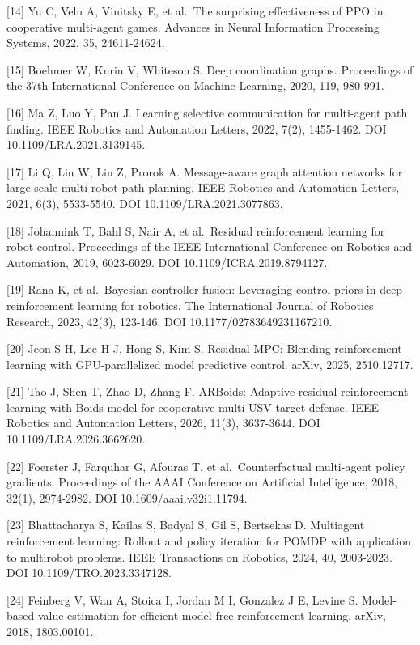 \documentclass[UTF8,a4paper,zihao=5,fontset=none]{ctexart}
\begin{document}
{[}14{]} Yu C, Velu A, Vinitsky E, et al.~The surprising effectiveness
of PPO in cooperative multi-agent games. Advances in Neural Information
Processing Systems, 2022, 35, 24611-24624.

{[}15{]} Boehmer W, Kurin V, Whiteson S. Deep coordination graphs.
Proceedings of the 37th International Conference on Machine Learning,
2020, 119, 980-991.

{[}16{]} Ma Z, Luo Y, Pan J. Learning selective communication for
multi-agent path finding. IEEE Robotics and Automation Letters, 2022,
7(2), 1455-1462. DOI 10.1109/LRA.2021.3139145.

{[}17{]} Li Q, Lin W, Liu Z, Prorok A. Message-aware graph attention
networks for large-scale multi-robot path planning. IEEE Robotics and
Automation Letters, 2021, 6(3), 5533-5540. DOI 10.1109/LRA.2021.3077863.

{[}18{]} Johannink T, Bahl S, Nair A, et al.~Residual reinforcement
learning for robot control. Proceedings of the IEEE International
Conference on Robotics and Automation, 2019, 6023-6029. DOI
10.1109/ICRA.2019.8794127.

{[}19{]} Rana K, et al.~Bayesian controller fusion: Leveraging control
priors in deep reinforcement learning for robotics. The International
Journal of Robotics Research, 2023, 42(3), 123-146. DOI
10.1177/02783649231167210.

{[}20{]} Jeon S H, Lee H J, Hong S, Kim S. Residual MPC: Blending
reinforcement learning with GPU-parallelized model predictive control.
arXiv, 2025, 2510.12717.

{[}21{]} Tao J, Shen T, Zhao D, Zhang F. ARBoids: Adaptive residual
reinforcement learning with Boids model for cooperative multi-USV target
defense. IEEE Robotics and Automation Letters, 2026, 11(3), 3637-3644.
DOI 10.1109/LRA.2026.3662620.

{[}22{]} Foerster J, Farquhar G, Afouras T, et al.~Counterfactual
multi-agent policy gradients. Proceedings of the AAAI Conference on
Artificial Intelligence, 2018, 32(1), 2974-2982. DOI
10.1609/aaai.v32i1.11794.

{[}23{]} Bhattacharya S, Kailas S, Badyal S, Gil S, Bertsekas D.
Multiagent reinforcement learning: Rollout and policy iteration for
POMDP with application to multirobot problems. IEEE Transactions on
Robotics, 2024, 40, 2003-2023. DOI 10.1109/TRO.2023.3347128.

{[}24{]} Feinberg V, Wan A, Stoica I, Jordan M I, Gonzalez J E, Levine
S. Model-based value estimation for efficient model-free reinforcement
learning. arXiv, 2018, 1803.00101.
\end{document}
